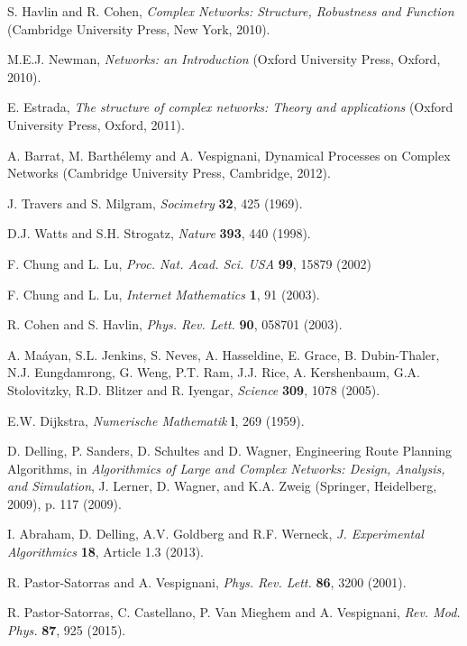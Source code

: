 \documentclass[preprint,pre,superscriptaddress,showpacs]{revtex4}
\begin{document}
\begin{thebibliography}{10}


S. Havlin and R. Cohen,
{\it Complex Networks: Structure, Robustness and Function}
(Cambridge University Press, New York, 2010).

M.E.J. Newman, 
{\it Networks: an Introduction} 
(Oxford University Press, Oxford, 2010).

E. Estrada, 
{\it The structure of complex networks: Theory and applications} 
(Oxford University Press, Oxford, 2011).


A. Barrat, M. Barth\'elemy and A. Vespignani,
Dynamical Processes on Complex Networks
(Cambridge University Press, Cambridge, 2012).

J. Travers and S. Milgram,
{\it Socimetry} {\bf 32}, 425 (1969).

D.J. Watts and S.H. Strogatz, 
{\it Nature} {\bf 393}, 440 (1998).


F. Chung and L. Lu, 
{\it Proc. Nat. Acad. Sci. USA}  
{\bf 99}, 15879 (2002)

F. Chung and L. Lu, 
{\it Internet Mathematics} {\bf 1}, 91 (2003).


R. Cohen and S. Havlin, 
{\it Phys. Rev. Lett.} {\bf 90}, 058701 (2003).


A. Ma\'ayan, S.L. Jenkins, S. Neves, A. Hasseldine, E. Grace, B. Dubin-Thaler, 
N.J. Eungdamrong, G. Weng, P.T. Ram, J.J. Rice, A. Kershenbaum, G.A. Stolovitzky, 
R.D. Blitzer and R. Iyengar,
{\it Science} {\bf 309}, 1078 (2005).

E.W. Dijkstra,
{\it Numerische Mathematik} {\bf l}, 269 (1959).

D. Delling, P. Sanders, D. Schultes and D. Wagner, 
Engineering Route Planning Algorithms, in 
{\it Algorithmics of Large and Complex Networks: Design, 
Analysis, and Simulation}, 
J. Lerner, D. Wagner, and K.A. Zweig (Springer, Heidelberg, 2009), 
p. 117 (2009).

I. Abraham, D. Delling, A.V. Goldberg and R.F. Werneck, 
{\it J. Experimental Algorithmics} {\bf 18}, Article 1.3 (2013).

R. Pastor-Satorras and A. Vespignani, 
{\it Phys. Rev. Lett.} {\bf 86},  3200  (2001).

R. Pastor-Satorras, C. Castellano, P. Van Mieghem
and A. Vespignani, 
{\it Rev. Mod. Phys.} {\bf 87}, 925 (2015).


\end{thebibliography}
\end{document}
